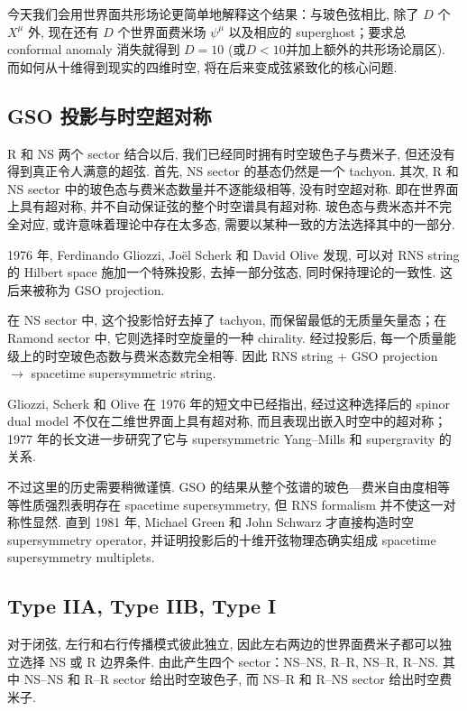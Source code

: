 \documentclass[10pt]{article}
\numberwithin{equation}{section}
\begin{document}
今天我们会用世界面共形场论更简单地解释这个结果：与玻色弦相比, 除了 $D$ 个 $X^\mu$ 外, 现在还有 $D$ 个世界面费米场 $\psi^\mu$ 以及相应的 superghost；要求总 conformal anomaly 消失就得到 $D=10$ (或$D<10$并加上额外的共形场论扇区). 而如何从十维得到现实的四维时空, 将在后来变成弦紧致化的核心问题. 

\subsection{GSO 投影与时空超对称}

R 和 NS 两个 sector 结合以后, 我们已经同时拥有时空玻色子与费米子, 但还没有得到真正令人满意的超弦. 首先, NS sector 的基态仍然是一个 tachyon. 其次, R 和 NS sector 中的玻色态与费米态数量并不逐能级相等, 没有时空超对称. 即在世界面上具有超对称, 并不自动保证弦的整个时空谱具有超对称. 玻色态与费米态并不完全对应, 或许意味着理论中存在太多态, 需要以某种一致的方法选择其中的一部分. 

1976 年, Ferdinando Gliozzi, Joël Scherk 和 David Olive 发现, 可以对 RNS string 的 Hilbert space 施加一个特殊投影, 去掉一部分弦态, 同时保持理论的一致性. 这后来被称为 GSO projection\cite{GliozziScherkOlive1976,GliozziScherkOlive1977}. 

在 NS sector 中, 这个投影恰好去掉了 tachyon, 而保留最低的无质量矢量态；在 Ramond sector 中, 它则选择时空旋量的一种 chirality. 经过投影后, 每一个质量能级上的时空玻色态数与费米态数完全相等. 因此 RNS string + GSO projection $\longrightarrow$ spacetime supersymmetric string.

Gliozzi, Scherk 和 Olive 在 1976 年的短文中已经指出, 经过这种选择后的 spinor dual model 不仅在二维世界面上具有超对称, 而且表现出嵌入时空中的超对称；1977 年的长文进一步研究了它与 supersymmetric Yang–Mills 和 supergravity 的关系. 

不过这里的历史需要稍微谨慎. GSO 的结果从整个弦谱的玻色—费米自由度相等等性质强烈表明存在 spacetime supersymmetry, 但 RNS formalism 并不使这一对称性显然. 直到 1981 年, Michael Green 和 John Schwarz 才直接构造时空 supersymmetry operator, 并证明投影后的十维开弦物理态确实组成 spacetime supersymmetry multiplets\cite{GreenSchwarz1981}. 

\subsection{Type IIA, Type IIB, Type I}

对于闭弦, 左行和右行传播模式彼此独立, 因此左右两边的世界面费米子都可以独立选择 NS 或 R 边界条件. 由此产生四个 sector：NS–NS, R–R, NS–R, R–NS. 其中 NS–NS 和 R–R sector 给出时空玻色子, 而 NS–R 和 R–NS sector 给出时空费米子. 
\end{document}
